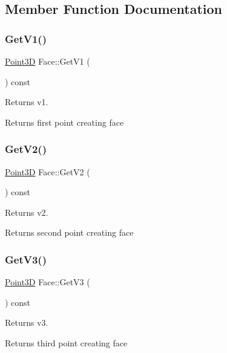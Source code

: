 \subsection{Member Function Documentation}
\hypertarget{class_face_ae6df8ea5ce4f2b7b6a5ad1dcc6fb4d07}{}\label{class_face_ae6df8ea5ce4f2b7b6a5ad1dcc6fb4d07} 
\subsubsection{\texorpdfstring{Get\+V1()}{GetV1()}}
{\footnotesize\ttfamily \hyperlink{class_point3_d}{Point3D} Face\+::\+Get\+V1 (\begin{DoxyParamCaption}{ }\end{DoxyParamCaption}) const}

Returns v1. \begin{DoxyReturn}{Returns}
first point creating face 
\end{DoxyReturn}
\hypertarget{class_face_a8ce9ccf7617c5d7224d885c08cf8651e}{}\label{class_face_a8ce9ccf7617c5d7224d885c08cf8651e} 
\subsubsection{\texorpdfstring{Get\+V2()}{GetV2()}}
{\footnotesize\ttfamily \hyperlink{class_point3_d}{Point3D} Face\+::\+Get\+V2 (\begin{DoxyParamCaption}{ }\end{DoxyParamCaption}) const}

Returns v2. \begin{DoxyReturn}{Returns}
second point creating face 
\end{DoxyReturn}
\hypertarget{class_face_a8aaddb9ebb59e71a21df96e6d38fe29d}{}\label{class_face_a8aaddb9ebb59e71a21df96e6d38fe29d} 
\subsubsection{\texorpdfstring{Get\+V3()}{GetV3()}}
{\footnotesize\ttfamily \hyperlink{class_point3_d}{Point3D} Face\+::\+Get\+V3 (\begin{DoxyParamCaption}{ }\end{DoxyParamCaption}) const}

Returns v3. \begin{DoxyReturn}{Returns}
third point creating face 
\end{DoxyReturn}
\hypertarget{class_face_a0aa6787b68f53915e9638eff3b32f6db}{}\label{class_face_a0aa6787b68f53915e9638eff3b32f6db} 
